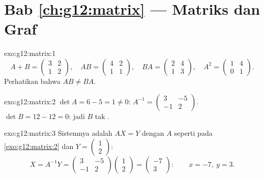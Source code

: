 \section*{Bab \ref{ch:g12:matrix} --- Matriks dan Graf}

\begin{solution}{exo:g12:matrix:1}
\[
A + B = \begin{pmatrix} 3 & 2\\ 1 & 2\end{pmatrix}, \quad
AB = \begin{pmatrix} 4 & 2\\ 1 & 1\end{pmatrix}, \quad
BA = \begin{pmatrix} 2 & 4\\ 1 & 3\end{pmatrix}, \quad
A^2 = \begin{pmatrix} 1 & 4\\ 0 & 1\end{pmatrix}.
\]
Perhatikan bahwa $AB \neq BA$.
\end{solution}

\begin{solution}{exo:g12:matrix:2}
$\det A = 6 - 5 = 1 \neq 0$:
$A^{-1} = \begin{pmatrix} 3 & -5\\ -1 & 2 \end{pmatrix}$.
$\det B = 12 - 12 = 0$: jadi $B$ tak .
\end{solution}

\begin{solution}{exo:g12:matrix:3}
Sistemnya adalah $AX = Y$ dengan $A$ seperti pada \cref{exo:g12:matrix:2} dan
$Y = \begin{pmatrix} 1\\ 2\end{pmatrix}$:
\[
X = A^{-1}Y = \begin{pmatrix} 3 & -5\\ -1 & 2\end{pmatrix}
\begin{pmatrix} 1\\ 2\end{pmatrix}
= \begin{pmatrix} -7\\ 3\end{pmatrix}:
\qquad x = -7,\ y = 3 .
\]
\end{solution}

